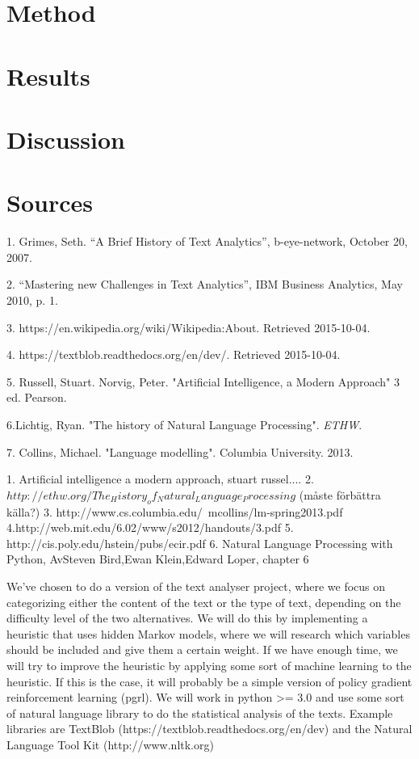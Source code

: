 \documentclass[a4paper]{article}
\begin{document}
 



\section*{Method}  

\section*{Results}

\section*{Discussion}


\section*{Sources}


1. Grimes, Seth. “A Brief History of Text Analytics”, b-eye-network, October 20, 2007.

2. “Mastering new Challenges in Text Analytics”, IBM Business Analytics, May 2010, p. 1.

3. https://en.wikipedia.org/wiki/Wikipedia:About. Retrieved 2015-10-04.

4. https://textblob.readthedocs.org/en/dev/. Retrieved 2015-10-04.

5. Russell, Stuart. Norvig, Peter. "Artificial Intelligence, a Modern Approach" 3 ed. Pearson. 

6.Lichtig, Ryan. "The history of Natural Language Processing". \textit{ETHW}. 

7. Collins, Michael. "Language modelling". Columbia University. 2013.


1. Artificial intelligence a modern approach, stuart russel....
2. $http://ethw.org/The_History_of_Natural_Language_Processing$ (måste förbättra källa?)
3. http://www.cs.columbia.edu/~mcollins/lm-spring2013.pdf
4.http://web.mit.edu/6.02/www/s2012/handouts/3.pdf
5. http://cis.poly.edu/hstein/pubs/ecir.pdf
6. Natural Language Processing with Python, AvSteven Bird,Ewan Klein,Edward Loper, chapter 6


We've chosen to do a version of the text analyser project, where we focus on categorizing either the content of the text or the type of text, depending on the difficulty level of the two alternatives. We will do this by implementing a heuristic that uses hidden Markov models, where we will research which variables should be included and give them a certain weight. If we have enough time, we will try to improve the heuristic by applying some sort of machine learning to the heuristic. If this is the case, it will probably be a simple version of policy gradient reinforcement learning (pgrl). We will work in python \textgreater= 3.0 and use some sort of natural language library to do the statistical analysis of the texts. Example libraries are TextBlob (https://textblob.readthedocs.org/en/dev) and the Natural Language Tool Kit (http://www.nltk.org)
\newline
\end{document}

